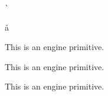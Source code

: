 \begin{function}[]
  {
    \`
  }
  \begin{syntax}
  \end{syntax}

\end{function}



\begin{function}[]
  {
    \aa
  }
  \begin{syntax}
  \end{syntax}

\end{function}



\begin{function}[]
  {
    \abovedisplayshortskip
  }
  \begin{syntax}
  \end{syntax}
  This is an engine primitive.
\end{function}



\begin{function}[]
  {
    \abovedisplayskip
  }
  \begin{syntax}
  \end{syntax}
  This is an engine primitive.
\end{function}



\begin{function}[]
  {
    \accent
  }
  \begin{syntax}
  \end{syntax}
  This is an engine primitive.
\end{function}



\begin{function}[]
  {
    \accent@spacefactor
  }
  \begin{syntax}
  \end{syntax}

\end{function}



\begin{function}[]
  {
    \active@math@prime
  }
  \begin{syntax}
  \end{syntax}

\end{function}



